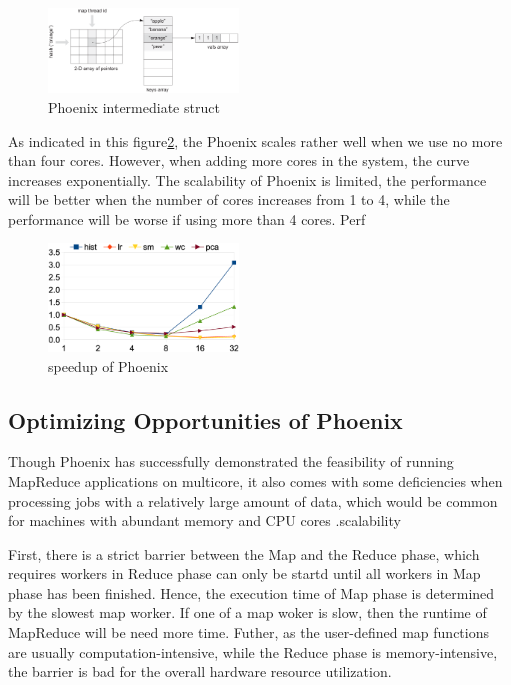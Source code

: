 \begin{figure}[!h!t]  
    \centering
    \includegraphics[width=0.45\textwidth]{eps/phoenix_intermediate.eps}
    \caption{Phoenix intermediate struct}
    \label{fig:phoenix:intermediate}
\end{figure}

As indicated in this figure\ref{fig:phoenix:speedup}, 
the Phoenix scales rather well when we use no more than four cores. 
However, when adding more cores in the system, 
the curve increases exponentially. 
The scalability of Phoenix is limited, the performance will be
better when the number of cores increases from 1 to 4, 
while the performance will be worse if using more than 4 cores. 
Perf\cite{} 


\begin{figure}[!h!t]  
    \centering
    \includegraphics[width=0.45\textwidth]{eps/phoenix_speedup.eps}
    \caption{speedup of Phoenix}
    \label{fig:phoenix:speedup}
\end{figure}


\subsection{Optimizing Opportunities of Phoenix}
Though Phoenix has successfully demonstrated the feasibility
of running MapReduce applications on multicore, 
it also comes with some deficiencies 
{\color{gray}when processing jobs with a relatively large
amount of data, which would be common for machines with abundant memory and CPU cores
}.{\color{blue}scalability}

First, there is a strict barrier between the Map and the Reduce phase, 
which requires workers in Reduce phase can only 
be startd until all workers in Map phase has been finished. 
Hence, the execution time of Map phase is determined by the slowest map worker.
If one of a map woker is slow, then the runtime of MapReduce will be need more time.
Futher, as the user-defined map functions are usually computation-intensive,
while the Reduce phase is memory-intensive,
the barrier is bad for the overall hardware resource utilization.


